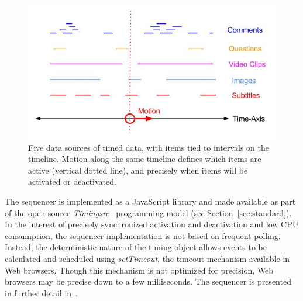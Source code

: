 \begin{figure}[h]
\centering
\includegraphics[scale=.4]{fig/sequencer.jpg}
\caption{Five data sources of timed data, with items tied to intervals on the timeline. Motion along the same timeline defines which items are active (vertical dotted line), and precisely when items will be activated or deactivated.}
\label{fig:sequencer}
\end{figure}


The sequencer is implemented as a JavaScript library and made available as
part of the open-source \emph{Timingsrc}~\cite{timingsrc} programming model
(see Section~\ref{sec:standard}). In the interest of precisely synchronized
activation and deactivation and low CPU consumption, the sequencer
implementation is not based on frequent polling. Instead, the deterministic
nature of the timing object allows events to be calculated and scheduled using
\emph{setTimeout}, the timeout mechanism available in Web browsers. Though
this mechanism is not optimized for precision, Web browsers may be precise
down to a few milliseconds. The sequencer is presented in further detail in~\cite{sequencer}.






